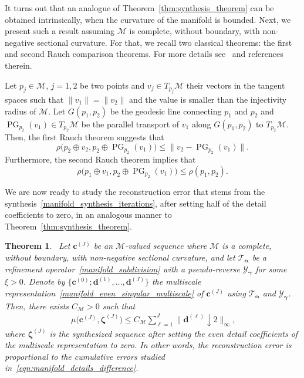 \documentclass[12pt]{article}
\newtheorem{theorem}{Theorem}[section]
\newcommand{\pg}{\operatorname{PG}}
\begin{document}
It turns out that an analogue of Theorem~\ref{thm:synthesis_theorem} can be obtained intrinsically, when the curvature of the manifold is bounded. Next, we present such a result assuming $\mathcal{M}$ is complete, without boundary, with non-negative sectional curvature. For that, we recall two classical theorems: the first and second Rauch comparison theorems. For more details see~\cite[Chapter 3]{gromoll2009metric} and references therein.

Let $p_j \in \mathcal{M}$, $j=1,2$ be two points and $v_j \in T_{p_j}\mathcal{M}$ their vectors in the tangent spaces such that $\| v_1 \|=\| v_2 \|$ and the value is smaller than the injectivity radius of $\mathcal{M}$. Let $ G(p_1,p_2)$ be the geodesic line connecting $p_1$ and $p_2$ and $\pg_{p_2}(v_1) \in T_{p_2}\mathcal{M}$ be the parallel transport of $v_1$ along $G(p_1,p_2)$ to $T_{p_2}\mathcal{M}$. Then, the first Rauch theorem suggests that
\begin{equation} \label{eqn:rauch1}
\rho \big(p_2 \oplus v_2, p_2 \oplus \pg_{p_2}(v_1)\big)  \le \|v_2- \pg_{p_2}(v_1) \|.
\end{equation}
Furthermore, the second Rauch theorem implies that 
\begin{equation} \label{eqn:rauch2}
    \rho \big(p_1 \oplus v_1, p_2 \oplus \pg_{p_2}(v_1)\big)  \le \rho( p_1, p_2).
\end{equation}

We are now ready to study the reconstruction error that stems from the synthesis~\eqref{manifold_synthesis_iterations}, after setting half of the detail coefficients to zero, in an analogous manner to Theorem~\ref{thm:synthesis_theorem}.

\begin{theorem}~\label{ManifoldStabilityTHM}
    Let $\boldsymbol{c}^{(J)}$ be an $\mathcal{M}$-valued sequence where $\mathcal{M}$ is a complete, without boundary, with non-negative sectional curvature,  and let $\mathcal{T}_{\boldsymbol{\alpha}}$ be a refinement operator~\eqref{manifold_subdivision} with a pseudo-reverse $\mathcal{Y}_{\boldsymbol{\gamma}}$ for some $\xi>0$. Denote by $\{\boldsymbol{c}^{(0)};\boldsymbol{d}^{(1)},\dots,\boldsymbol{d}^{(J)}\}$ the multiscale representation~\eqref{manifold_even_singular_multiscale} of $\boldsymbol{c}^{(J)}$ using $\mathcal{T}_{\boldsymbol{\alpha}}$ and $ \mathcal{Y}_{\boldsymbol{\gamma}}$. Then, there exists $C_{\mathcal{M}}>0$ such that
    \begin{align}~\label{eqn:manifold_stability}
            \mu\big(\boldsymbol{c}^{(J)}, \boldsymbol{\zeta}^{(J)}\big) \leq C_{\mathcal{M}}\sum_{\ell=1}^{J}\|\boldsymbol{d}^{(\ell)}\downarrow 2\|_\infty,
    \end{align}
    where $\boldsymbol{\zeta}^{(J)}$ is the synthesized sequence after setting the even detail coefficients of the multiscale representation to zero. In other words, the reconstruction error is proportional to the cumulative errors studied in~\eqref{eqn:manifold_details_difference}.
\end{theorem}
\end{document}

